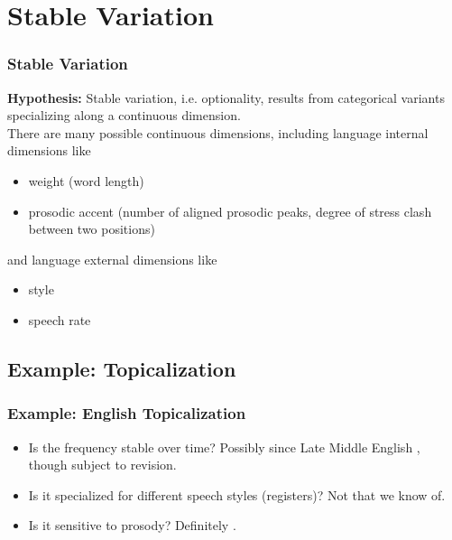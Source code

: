 \documentclass[hyperref={pdfpagelabels=false}]{beamer}
\begin{document}
\section{Stable Variation}
\begin{frame}
\frametitle{Stable Variation}
\textbf{Hypothesis:} Stable variation, i.e. optionality, results from categorical variants specializing along a continuous dimension.\\
\vspace{4mm}
There are many possible continuous dimensions, including language internal dimensions like
	\begin{itemize}
		\item weight (word length)
		\item prosodic accent (number of aligned prosodic peaks, degree of stress clash between two positions)
	\end{itemize}
and language external dimensions like
	\begin{itemize}
		\item style
		\item speech rate
	\end{itemize}
\end{frame}

\subsection{Example: Topicalization}
\begin{frame}
\frametitle{Example: English Topicalization}

\begin{itemize}
	\item Is the frequency stable over time? Possibly since Late Middle English \citep{speyer2010}, though subject to revision.
	\item Is it specialized for different speech styles (registers)? Not that we know of.
	\item Is it sensitive to prosody? Definitely \citep{speyer2008, speyer2010}.
\end{itemize}
\end{frame}
\end{document}
